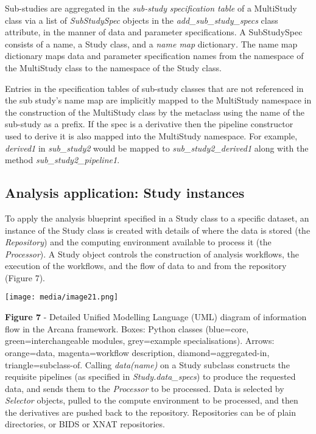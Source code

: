Sub-studies are aggregated in the \emph{sub-study} \emph{specification
table} of a MultiStudy class via a list of \emph{SubStudySpec} objects
in the \emph{add\_sub\_study\_specs} class attribute, in the manner of
data and parameter specifications. A SubStudySpec consists of a name, a
Study class, and a \emph{name map} dictionary\emph{.} The name map
dictionary maps data and parameter specification names from the
namespace of the MultiStudy class to the namespace of the Study class.

Entries in the specification tables of sub-study classes that are not
referenced in the sub study's name map are implicitly mapped to the
MultiStudy namespace in the construction of the MultiStudy class by the
metaclass using the name of the sub-study as a prefix. If the spec is a
derivative then the pipeline constructor used to derive it is also
mapped into the MultiStudy namespace. For example, \emph{derived1} in
\emph{sub\_study2} would be mapped to \emph{sub\_study2\_derived1} along
with the method \emph{sub\_study2\_pipeline1}.

\hypertarget{analysis-application-study-instances}{%
\subsection{Analysis application: Study
instances}\label{analysis-application-study-instances}}

To apply the analysis blueprint specified in a Study class to a specific
dataset, an instance of the Study class is created with details of where
the data is stored (the \emph{Repository}) and the computing environment
available to process it (the \emph{Processor}). A Study object controls
the construction of analysis workflows, the execution of the workflows,
and the flow of data to and from the repository (Figure 7).

\texttt{[image: media/image21.png]}

\textbf{Figure 7} - Detailed Unified Modelling Language (UML) diagram of
information flow in the Arcana framework. Boxes: Python classes
(blue=core, green=interchangeable modules, grey=example
specialisations). Arrows: orange=data, magenta=workflow description,
diamond=aggregated-in, triangle=subclass-of. Calling \emph{data(name)}
on a Study subclass constructs the requisite pipelines (as specified in
\emph{Study.data\_specs}) to produce the requested data, and sends them
to the \emph{Processor} to be processed. Data is selected by
\emph{Selector} objects, pulled to the compute environment to be
processed, and then the derivatives are pushed back to the repository.
Repositories can be of plain directories, or BIDS or XNAT repositories.

